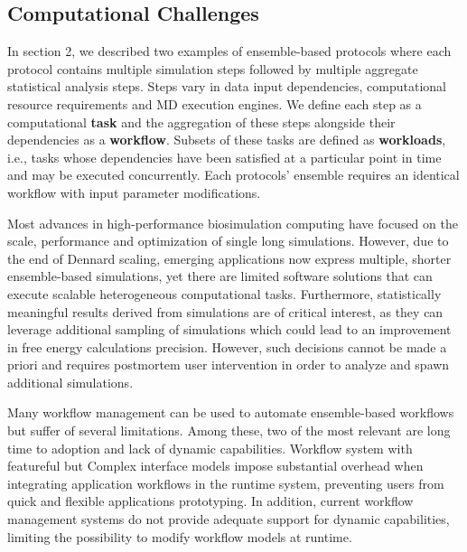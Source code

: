 \subsection{Computational Challenges}

In section 2, we described two examples of ensemble-based protocols where
each protocol contains multiple simulation steps followed by multiple
aggregate statistical analysis steps. Steps vary in data input dependencies,
computational resource requirements and MD execution engines. We define each
step as a computational \textbf{task} and the aggregation of these steps
alongside their dependencies as a \textbf{workflow}. Subsets of these tasks
are defined as \textbf{workloads}, i.e., tasks whose dependencies have been
satisfied at a particular point in time and may be executed concurrently.
Each protocols' ensemble requires an identical workflow with input parameter
modifications.

Most advances in high-performance biosimulation computing have focused on the
scale, performance and optimization of single long simulations. However, due
to the end of Dennard scaling, emerging applications now express multiple,
shorter ensemble-based simulations, yet there are limited software solutions
that can execute scalable heterogeneous computational tasks. Furthermore,
statistically meaningful results derived from simulations are of critical
interest, as they can leverage additional sampling of simulations which could
lead to an improvement in free energy calculations precision. However, such
decisions cannot be made a priori and requires postmortem user intervention
in order to analyze and spawn additional simulations.


Many workflow management can be used to automate ensemble-based workflows but
suffer of several limitations. Among these, two of the most relevant are long time to adoption and lack of dynamic capabilities.
Workflow system with featureful but Complex interface models impose
substantial overhead when integrating application workflows in the runtime
system, preventing users from quick and flexible applications prototyping.
In addition, current workflow management systems do not provide adequate
support for dynamic capabilities, limiting the possibility to modify workflow
models at runtime.

